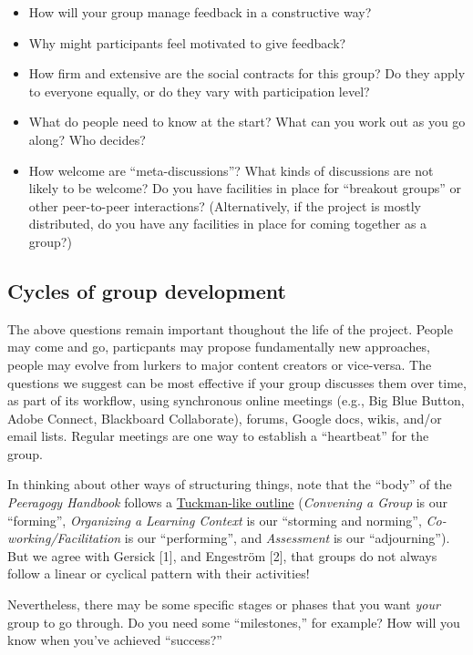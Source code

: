 \begin{itemize}
\item
  How will your group manage feedback in a constructive way?
\item
  Why might participants feel motivated to give feedback?
\item
  How firm and extensive are the social contracts for this group? Do
  they apply to everyone equally, or do they vary with participation
  level?
\item
  What do people need to know at the start? What can you work out as you
  go along? Who decides?
\item
  How welcome are ``meta-discussions''? What kinds of discussions are
  not likely to be welcome? Do you have facilities in place for
  ``breakout groups'' or other peer-to-peer interactions?
  (Alternatively, if the project is mostly distributed, do you have any
  facilities in place for coming together as a group?)
\end{itemize}
\subsection{Cycles of group development}

The above questions remain important thoughout the life of the project.
People may come and go, particpants may propose fundamentally new
approaches, people may evolve from lurkers to major content creators or
vice-versa. The questions we suggest can be most effective if your group
discusses them over time, as part of its workflow, using synchronous
online meetings (e.g., Big Blue Button, Adobe Connect, Blackboard Collaborate), forums, Google docs, wikis, and/or email lists. Regular
meetings are one way to establish a ``heartbeat'' for the group.

In thinking about other ways of structuring things, note that the
``body'' of the \emph{Peeragogy Handbook} follows a
\href{http://en.wikipedia.org/wiki/Forming-storming-norming-performing}{Tuckman-like
outline} (\emph{Convening a Group} is our ``forming'', \emph{Organizing
a Learning Context} is our ``storming and norming'',
\emph{Co-working/Facilitation} is our ``performing'', and
\emph{Assessment} is our ``adjourning''). But we agree with Gersick
{[}1{]}, and Engeström {[}2{]}, that groups do not always follow a
linear or cyclical pattern with their activities!

Nevertheless, there may be some specific stages or phases that you want
\emph{your} group to go through. Do you need some ``milestones,'' for
example? How will you know when you've achieved ``success?''

